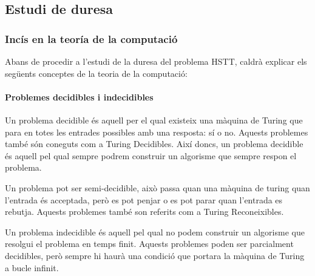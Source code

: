 \documentclass[11pt,a4paper,twoside]{report}
\begin{document}
    \subsection{Estudi de duresa}

    

    \subsubsection{Incís en la teoría de la computació}
    Abans de procedir a l'estudi de la duresa del problema HSTT, caldrà explicar els següents conceptes de la teoria de la computació: 
    \paragraph*{Problemes decidibles i indecidibles}

    Un problema decidible és aquell per el qual existeix una màquina de Turing que para en totes les entrades possibles amb una resposta: sí o no. Aquests problemes també són coneguts com a Turing Decidibles. 
    Així doncs, un problema decidible és aquell pel qual sempre podrem construir un algorisme que sempre respon el problema.
    
    Un problema pot ser semi-decidible, això passa quan una màquina de turing quan l'entrada és acceptada, però es pot penjar o es pot parar quan l'entrada es rebutja. Aquests problemes també son referits com a Turing Reconeixibles.
    
    Un problema indecidible és aquell pel qual no podem construir un algorisme que resolgui el problema en temps finit. Aquests problemes poden ser parcialment decidibles, però sempre hi haurà una condició que portara la màquina de Turing a bucle infinit.
\end{document}

